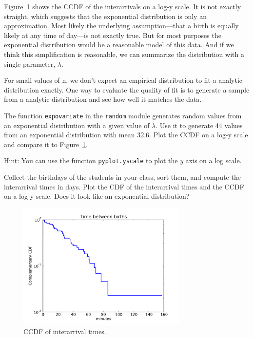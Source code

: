 \documentclass[12pt]{book}
\begin{document}
Figure~\ref{interarrival_ccdf} shows the CCDF of the interarrivals on
a log-y scale.  It is not exactly straight, which suggests that the
exponential distribution is only an approximation.  Most likely the
underlying assumption---that a birth is equally likely at any time of
day---is not exactly true.  But for most purposes the exponential
distribution would be a reasonable model of this data.  And if we
think this simplification is reasonable, we can summarize the distribution
with a single parameter, $\lambda$.

\begin{exercise}
For small values of n, we don't expect an empirical distribution
to fit a analytic distribution exactly.  One way to evaluate
the quality of fit is to generate a sample from a analytic
distribution and see how well it matches the data.

The function {\tt expovariate} in the {\tt random} module generates
random values from an exponential distribution with a given value of
$\lambda$.  Use it to generate 44 values from an exponential
distribution with mean 32.6.  Plot the CCDF on a log-y scale and
compare it to Figure~\ref{interarrival_ccdf}.

Hint: You can use the function {\tt pyplot.yscale} to plot the $y$ axis
on a log scale.

\end{exercise}

\begin{exercise}
Collect the birthdays of the students in your class, sort them, and
compute the interarrival times in days.  Plot the CDF of the interarrival
times and the CCDF on a log-y scale.  Does it look like
an exponential distribution?

\end{exercise}


\begin{figure}
\centerline{\includegraphics[height=2.5in]{figs/interarrivals_logy.pdf}}
\caption{CCDF of interarrival times.}
\label{interarrival_ccdf}
\end{figure}
\end{document}
